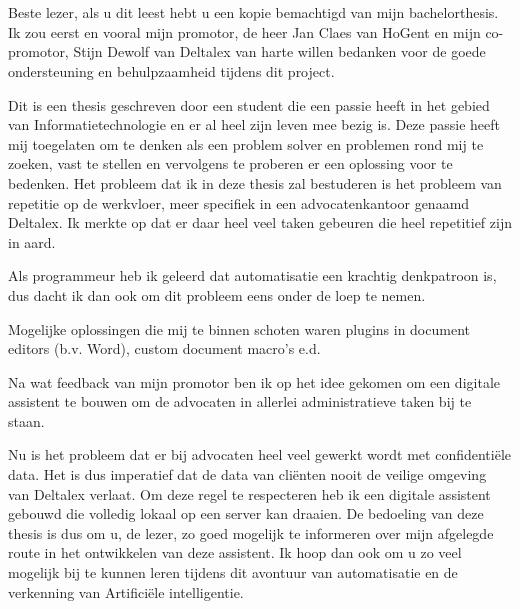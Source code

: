 
\chapter*{}%
\label{ch:voorwoord}


Beste lezer, als u dit leest hebt u een kopie bemachtigd van mijn bachelorthesis. 
Ik zou eerst en vooral mijn promotor, de heer Jan Claes van HoGent en mijn co-promotor, 
Stijn Dewolf van Deltalex van harte willen bedanken voor de goede ondersteuning en behulpzaamheid tijdens dit project. 

Dit is een thesis geschreven door een student die een passie heeft in het gebied van Informatietechnologie en er al heel zijn leven mee bezig is. 
Deze passie heeft mij toegelaten om te denken als een problem solver en problemen rond mij te zoeken, vast te stellen en vervolgens te proberen er een oplossing voor te bedenken. 
Het probleem dat ik in deze thesis zal bestuderen is het probleem van repetitie op de werkvloer, meer specifiek in een advocatenkantoor genaamd Deltalex. 
Ik merkte op dat er daar heel veel taken gebeuren die heel repetitief zijn in aard. 

Als programmeur heb ik geleerd dat automatisatie een krachtig denkpatroon is, dus dacht ik dan ook om dit probleem eens onder de loep te nemen. 

Mogelijke oplossingen die mij te binnen schoten waren plugins in document editors (b.v. Word), custom document macro's e.d. 

Na wat feedback van mijn promotor ben ik op het idee gekomen om een digitale assistent te bouwen om de advocaten in allerlei administratieve taken bij te staan. 

Nu is het probleem dat er bij advocaten heel veel gewerkt wordt met confidentiële data. 
Het is dus imperatief dat de data van cliënten nooit de veilige omgeving van Deltalex verlaat. 
Om deze regel te respecteren heb ik een digitale assistent gebouwd die volledig lokaal op een server kan draaien. 
De bedoeling van deze thesis is dus om u, de lezer, zo goed mogelijk te informeren over mijn afgelegde route in het ontwikkelen van deze assistent. 
Ik hoop dan ook om u zo veel mogelijk bij te kunnen leren tijdens dit avontuur van automatisatie en de verkenning van Artificiële intelligentie. 
